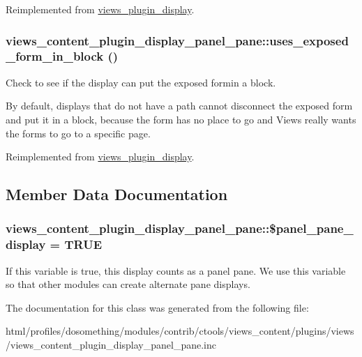 Reimplemented from \hyperlink{classviews__plugin__display_ae1d8ce3a491253cd56c5e8fc1d62c008}{views\_\-plugin\_\-display}.\hypertarget{classviews__content__plugin__display__panel__pane_a3667ee55d2a670612fe82cdbb0a5c4bd}{
\subsubsection[{uses\_\-exposed\_\-form\_\-in\_\-block}]{\setlength{\rightskip}{0pt plus 5cm}views\_\-content\_\-plugin\_\-display\_\-panel\_\-pane::uses\_\-exposed\_\-form\_\-in\_\-block ()}}
\label{classviews__content__plugin__display__panel__pane_a3667ee55d2a670612fe82cdbb0a5c4bd}
Check to see if the display can put the exposed formin a block.

By default, displays that do not have a path cannot disconnect the exposed form and put it in a block, because the form has no place to go and Views really wants the forms to go to a specific page. 

Reimplemented from \hyperlink{classviews__plugin__display_a565b6c45535dd419f600c9b27962c621}{views\_\-plugin\_\-display}.

\subsection{Member Data Documentation}
\hypertarget{classviews__content__plugin__display__panel__pane_a9a83e16864538a66009798e8d43e8064}{
\subsubsection[{\$panel\_\-pane\_\-display}]{\setlength{\rightskip}{0pt plus 5cm}views\_\-content\_\-plugin\_\-display\_\-panel\_\-pane::\$panel\_\-pane\_\-display = TRUE}}
\label{classviews__content__plugin__display__panel__pane_a9a83e16864538a66009798e8d43e8064}
If this variable is true, this display counts as a panel pane. We use this variable so that other modules can create alternate pane displays. 

The documentation for this class was generated from the following file:\begin{DoxyCompactItemize}
\item 
html/profiles/dosomething/modules/contrib/ctools/views\_\-content/plugins/views/views\_\-content\_\-plugin\_\-display\_\-panel\_\-pane.inc\end{DoxyCompactItemize}
